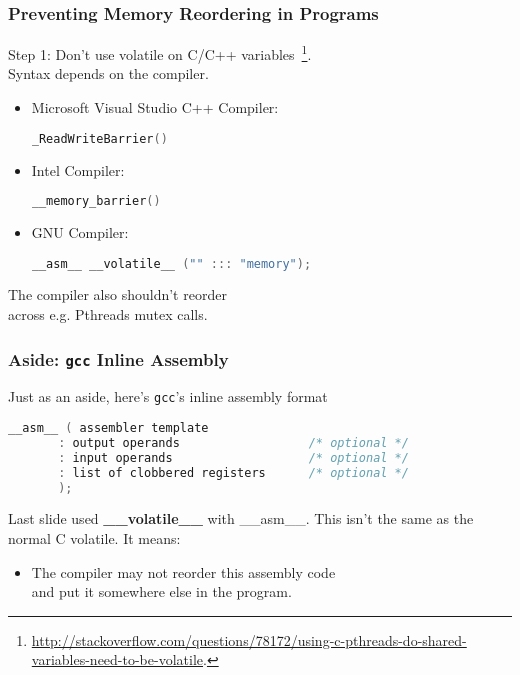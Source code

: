 \begin{frame}[fragile]
  \frametitle{Preventing Memory Reordering in Programs}

  
     Step 1: Don't use volatile on C/C++ variables~\footnote{\tiny \url{http://stackoverflow.com/questions/78172/using-c-pthreads-do-shared-variables-need-to-be-volatile}.}.\\[1em]
     Syntax depends on the compiler.\\

\begin{itemize}
  \item Microsoft Visual Studio C++ Compiler:
  \begin{lstlisting}[language=C]
_ReadWriteBarrier()
  \end{lstlisting}
  \item Intel Compiler:
  \begin{lstlisting}[language=C]
    __memory_barrier()
  \end{lstlisting}
  \item GNU Compiler:
  \begin{lstlisting}[language=C]
__asm__ __volatile__ ("" ::: "memory");
  \end{lstlisting}
\end{itemize}

  The compiler also shouldn't reorder\\ across e.g. Pthreads mutex calls.
  
\end{frame}

\begin{frame}[fragile]
  \frametitle{Aside: {\tt gcc} Inline Assembly}

  

  Just as an aside, here's {\tt gcc}'s inline assembly format

  \begin{lstlisting}[language=C]
__asm__ ( assembler template 
       : output operands                  /* optional */
       : input operands                   /* optional */
       : list of clobbered registers      /* optional */
       );
  \end{lstlisting}
  \vfill
  Last slide used {\bf \_\_volatile\_\_} with  \_\_asm\_\_. This isn't the same as the normal C volatile. It means:

  \begin{itemize}
    \item The compiler may not reorder this assembly code\\ and put it somewhere
      else in the program.
  \end{itemize}
  

\end{frame}

